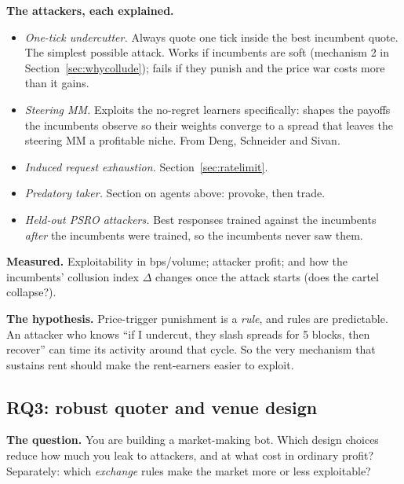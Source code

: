 \documentclass[11pt]{article}
\begin{document}
\textbf{The attackers, each explained.}
\begin{itemize}
\item \emph{One-tick undercutter.} Always quote one tick inside the best incumbent quote. The simplest possible attack. Works if incumbents are soft (mechanism 2 in Section~\ref{sec:whycollude}); fails if they punish and the price war costs more than it gains.
\item \emph{Steering MM.} Exploits the no-regret learners specifically: shapes the payoffs the incumbents observe so their weights converge to a spread that leaves the steering MM a profitable niche. From Deng, Schneider and Sivan.
\item \emph{Induced request exhaustion.} Section~\ref{sec:ratelimit}.
\item \emph{Predatory taker.} Section on agents above: provoke, then trade.
\item \emph{Held-out PSRO attackers.} Best responses trained against the incumbents \emph{after} the incumbents were trained, so the incumbents never saw them.
\end{itemize}
\textbf{Measured.} Exploitability in bps/volume; attacker profit; and how the incumbents' collusion index $\Delta$ changes once the attack starts (does the cartel collapse?).

\textbf{The hypothesis.} Price-trigger punishment is a \emph{rule}, and rules are predictable. An attacker who knows ``if I undercut, they slash spreads for 5 blocks, then recover'' can time its activity around that cycle. So the very mechanism that sustains rent should make the rent-earners easier to exploit.

\subsection{RQ3: robust quoter and venue design}
\textbf{The question.} You are building a market-making bot. Which design choices reduce how much you leak to attackers, and at what cost in ordinary profit? Separately: which \emph{exchange} rules make the market more or less exploitable?
\end{document}
